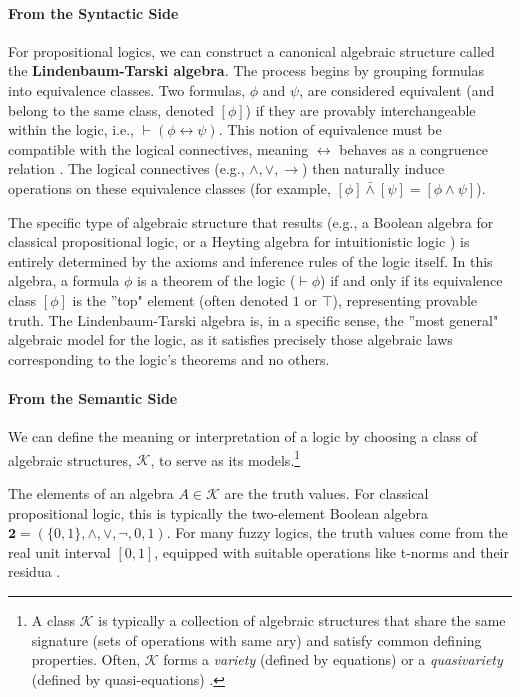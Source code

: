 \paragraph{From the Syntactic Side} For propositional logics, we can construct a canonical algebraic structure called the \textbf{Lindenbaum-Tarski algebra}. The process begins by grouping formulas into equivalence classes. Two formulas, $\phi$ and $\psi$, are considered equivalent (and belong to the same class, denoted $[\phi]$) if they are provably interchangeable within the logic, i.e., $\vdash (\phi \leftrightarrow \psi)$. This notion of equivalence must be compatible with the logical connectives, meaning $\leftrightarrow$ behaves as a congruence relation \cite[p.~1-2]{BlokPigozzi1989}. The logical connectives (e.g., $\wedge, \lor, \rightarrow$) then naturally induce operations on these equivalence classes (for example, $[\phi] \bar{\wedge} [\psi] = [\phi \wedge \psi]$).

The specific type of algebraic structure that results (e.g., a Boolean algebra for classical propositional logic, or a Heyting algebra for intuitionistic logic \cite[Ch.~1]{ResiduatedLattices2007}) is entirely determined by the axioms and inference rules of the logic itself. In this algebra, a formula $\phi$ is a theorem of the logic ($\vdash \phi$) if and only if its equivalence class $[\phi]$ is the ''top" element (often denoted $1$ or $\top$), representing provable truth. The Lindenbaum-Tarski algebra is, in a specific sense, the ''most general" algebraic model for the logic, as it satisfies precisely those algebraic laws corresponding to the logic's theorems and no others.

\paragraph{From the Semantic Side} We can define the meaning or interpretation of a logic by choosing a class of algebraic structures, $\mathcal{K}$, to serve as its models.\footnote{A class $\mathcal{K}$ is typically a collection of algebraic structures that share the same signature (sets of operations with same ary) and satisfy common defining properties. Often, $\mathcal{K}$ forms a \textit{variety} (defined by equations) or a \textit{quasivariety} (defined by quasi-equations) \cite[Def.~2.2]{BlokPigozzi1989}.}

The elements of an algebra $A \in \mathcal{K}$ are the truth values. For classical propositional logic, this is typically the two-element Boolean algebra $\mathbf{2} = (\{0,1\}, \land, \lor, \neg, 0, 1)$. For many fuzzy logics, the truth values come from the real unit interval $[0,1]$, equipped with suitable operations like t-norms and their residua \cite[Ch.~2]{Hajek1998}.

